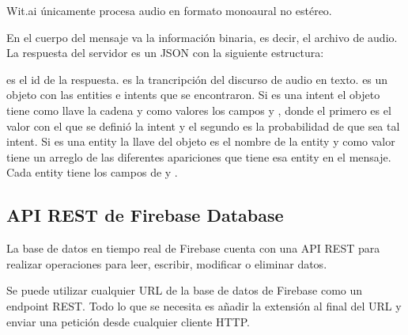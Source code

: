 Wit.ai únicamente procesa audio en formato monoaural no estéreo.

En el cuerpo del mensaje va la información binaria, es decir,
el archivo de audio. La respuesta del servidor
es un JSON con la siguiente estructura:

\begin{sphinxVerbatim}[commandchars=\\\{\}]
   
   
   
      \PYG{p}{[} 
       
       
     \PYG{p}{]}
     
       
       
\end{sphinxVerbatim}

 es el id de la respuesta.  es la trancripción
del discurso de audio en texto.  es un objeto con las
entities e intents que se encontraron. Si es una intent
el objeto tiene como llave la cadena  y como
valores los campos  y , donde el primero
es el valor con el que se definió la intent y el segundo es la
probabilidad de que sea tal intent. Si es una
entity la llave del objeto es el nombre de la entity y como valor
tiene un arreglo de las diferentes apariciones que tiene
esa entity en el mensaje. Cada entity tiene los campos de
 y .


\subsection{API REST de Firebase Database}
\label{\detokenize{chapter_one/apis_rest:api-rest-de-firebase-database}}
La base de datos en tiempo real de Firebase cuenta con una API REST
para realizar operaciones para leer, escribir, modificar o eliminar datos.

Se puede utilizar cualquier URL de la base de datos de Firebase como un endpoint
REST. Todo lo que se necesita es añadir la extensión  al final del
URL y enviar una petición desde cualquier cliente HTTP.

